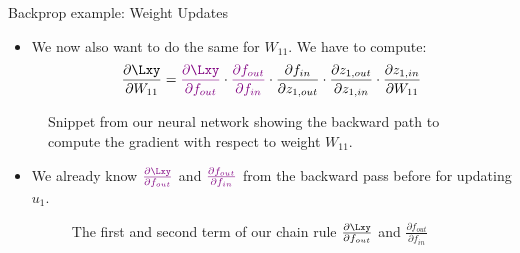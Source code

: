 \begin{vbframe}{Backprop example: Weight Updates}
  \begin{itemize}
    \item We now also want to do the same for $W_{11}$. We have to compute: $$\frac{\partial \Lxy}{\partial W_{11}} = \textcolor{violet}{\frac{\partial \Lxy}{\partial f_{out}}} \cdot \textcolor{violet}{\frac{\partial f_{out}}{\partial f_{in}}} \cdot \frac{\partial f_{in}}{\partial z_{1,out}} \cdot \frac{\partial z_{1,out}}{\partial z_{1,in}} \cdot \frac{\partial z_{1,in}}{\partial W_{11}}$$
  \end{itemize}
  \begin{figure}
    \centering
      \caption{Snippet from our neural network showing the backward path to compute the gradient with respect to weight $W_{11}$.}
  \end{figure}
\framebreak

  \begin{itemize}
    \item We already know $\textcolor{violet}{\frac{\partial \Lxy}{\partial f_{out}}}$ and $\textcolor{violet}{\frac{\partial f_{out}}{\partial f_{in}}}$ from the backward pass before for updating $u_1$.
  \begin{figure}
    \centering
      \caption{The first and second term of our chain rule $\frac{\partial \Lxy}{\partial f_{out}}$ and $\frac{\partial f_{out}}{\partial f_{in}}$}
  \end{figure}
\framebreak


\end{itemize}
\end{vbframe}

